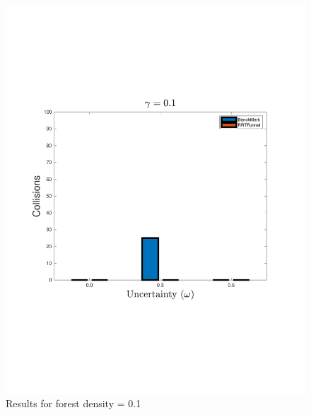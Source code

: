 \begin{figure}
  \centering \includegraphics[scale=.5]{figures/experiments/ResultPlot01}
  \caption{Results for forest density = 0.1}
  \label{fig:result0.1}
\end{figure}

